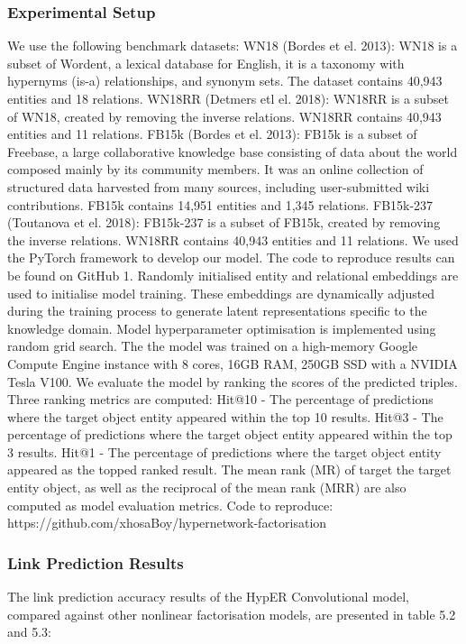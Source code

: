 \subsubsection{Experimental Setup} 

We use the following benchmark datasets: WN18 (Bordes et el. 2013): WN18 is a subset of Wordent, a lexical database for English, it is a taxonomy with hypernyms (is-a) relationships, and synonym sets. The dataset contains 40,943 entities and 18 relations. WN18RR (Detmers etl el. 2018): WN18RR is a subset of WN18, created by removing the inverse relations. WN18RR contains 40,943 entities and 11 relations. \newline 
FB15k (Bordes et el. 2013): FB15k is a subset of Freebase, a large collaborative knowledge base consisting of data about the world composed mainly by its community members. It was an online collection of structured data harvested from many sources, including user-submitted wiki contributions. FB15k contains 14,951 entities and 1,345 relations. FB15k-237 (Toutanova et el. 2018): FB15k-237 is a subset of FB15k, created by removing the inverse relations. WN18RR contains 40,943 entities and 11 relations. \newline
We used the PyTorch framework to develop our model. The code to reproduce results can be found on GitHub 1. Randomly initialised entity and relational embeddings are used to initialise model training. These embeddings are dynamically adjusted during the training process to generate latent representations specific to the knowledge domain. Model hyperparameter optimisation is implemented using random grid search. The the model was trained on a high-memory Google Compute Engine instance with 8 cores, 16GB RAM, 250GB SSD with a NVIDIA Tesla V100. \newline
We evaluate the model by ranking the scores of the predicted triples. Three ranking metrics are computed: Hit@10 - The percentage of predictions where the target object entity appeared within the top 10 results. Hit@3 - The percentage of predictions where the target object entity appeared within the top 3 results. Hit@1 - The percentage of predictions where the target object entity appeared as the topped ranked result. The mean rank (MR) of target the target entity object, as well as the reciprocal of the mean rank (MRR) are also computed as model evaluation metrics. Code to reproduce: https://github.com/xhosaBoy/hypernetwork-factorisation

\subsubsection{Link Prediction Results}
The link prediction accuracy results of the HypER Convolutional model, compared against other nonlinear factorisation models, are presented in table 5.2 and 5.3:

